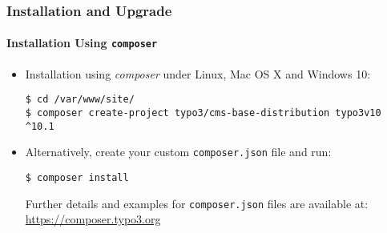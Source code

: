 
\begin{frame}[fragile]
	\frametitle{Installation and Upgrade}
	\framesubtitle{Installation Using \texttt{composer}}

	\begin{itemize}
		\item Installation using \textit{composer} under Linux, Mac OS X and Windows 10:

			\begin{lstlisting}
$ cd /var/www/site/
$ composer create-project typo3/cms-base-distribution typo3v10 ^10.1
			\end{lstlisting}

		\item Alternatively, create your custom \texttt{composer.json} file and run:

			\begin{lstlisting}
$ composer install
			\end{lstlisting}

			Further details and examples for \texttt{composer.json} files are available at:\newline
			\smaller
				\href{https://composer.typo3.org}{https://composer.typo3.org}
			\normalsize

	\end{itemize}
\end{frame}

